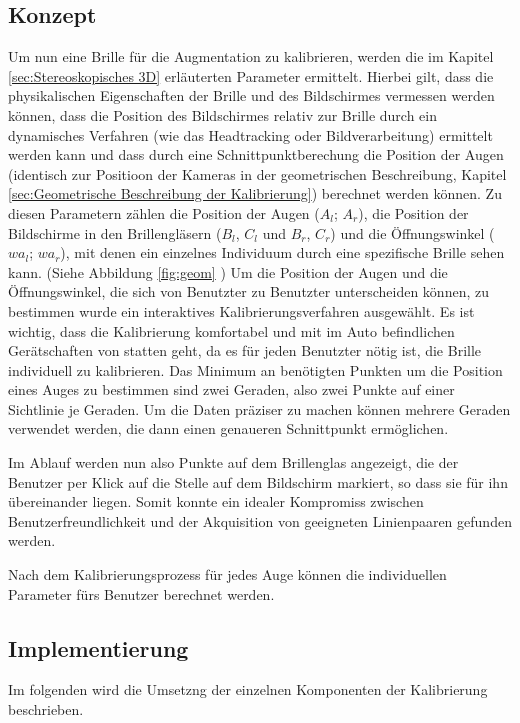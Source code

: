 \subsection{Konzept}
Um nun eine Brille für die Augmentation zu kalibrieren, werden die im Kapitel \ref{sec:Stereoskopisches 3D} erläuterten Parameter ermittelt.
Hierbei gilt, dass die physikalischen Eigenschaften der Brille und des Bildschirmes vermessen werden können, dass die Position des Bildschirmes relativ zur Brille durch ein dynamisches Verfahren (wie das Headtracking oder Bildverarbeitung) ermittelt werden kann und dass durch eine Schnittpunktberechung die Position der Augen (identisch zur Positioon der Kameras in der geometrischen Beschreibung, Kapitel \ref{sec:Geometrische Beschreibung der Kalibrierung}) berechnet werden können.
Zu diesen Parametern zählen die Position der Augen ($A_{l}$; $A_{r}$), die Position der Bildschirme in den Brillengläsern ($B_{l}$, $C_{l}$ und $B_{r}$, $C_{r}$) und die Öffnungswinkel ($wa_{l}$; $wa_{r}$), mit denen ein einzelnes Individuum durch eine spezifische Brille sehen kann. (Siehe Abbildung \ref{fig:geom} )
Um die Position der Augen und die Öffnungswinkel, die sich von Benutzter zu Benutzter unterscheiden können, zu bestimmen wurde ein interaktives Kalibrierungsverfahren ausgewählt. Es ist wichtig, dass die Kalibrierung komfortabel und mit im Auto befindlichen Gerätschaften von statten geht, da es für jeden Benutzter nötig ist, die Brille individuell zu kalibrieren. Das Minimum an benötigten Punkten um die Position eines Auges zu bestimmen sind zwei Geraden, also zwei Punkte auf einer Sichtlinie je Geraden. Um die Daten präziser zu machen können mehrere Geraden verwendet werden, die dann einen genaueren Schnittpunkt ermöglichen. 

Im Ablauf werden nun also Punkte auf dem Brillenglas angezeigt, die der Benutzer per Klick auf die Stelle auf dem Bildschirm markiert, so dass sie für ihn übereinander liegen. Somit konnte ein idealer Kompromiss zwischen Benutzerfreundlichkeit und der Akquisition von geeigneten Linienpaaren gefunden werden.

Nach dem Kalibrierungsprozess für jedes Auge können die individuellen Parameter fürs Benutzer berechnet werden.

\subsection{Implementierung}
Im folgenden wird die Umsetzng der einzelnen Komponenten der Kalibrierung beschrieben.


